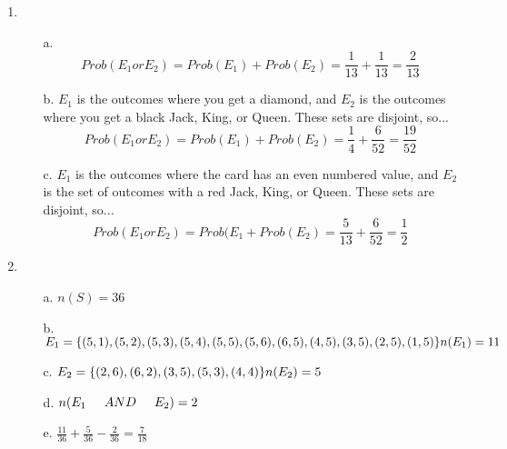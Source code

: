 {\begin{enumerate}
\begin{itemize}
                \item[c.]   When choosing a committee of three people
                            from a club with 8 men and 12 women, there are many ways in which
                            the committee can include a woman and a man,
                            so these events are not disjoint.
            \end{itemize}

        \item
            \begin{itemize}
                \item[a.]   $$Prob(E_{1} or E_{2}) = Prob(E_{1}) + Prob(E_{2}) = \frac{1}{13} + \frac{1}{13} = \frac{2}{13}$$

                \item[b.]   $E_{1}$ is the outcomes where you get a diamond,
                            and $E_{2}$ is the outcomes where you get a black Jack, King, or Queen.
                            These sets are disjoint, so...
                            $$Prob(E_{1} or E_{2}) = Prob(E_{1}) + Prob(E_{2}) = \frac{1}{4} + \frac{6}{52} = \frac{19}{52}$$

                \item[c.]   $E_{1}$ is the outcomes where the card has an even numbered value,
                            and $E_{2}$ is the set of outcomes with a red Jack, King, or Queen.
                            These sets are disjoint, so...
                            $$Prob(E_{1} or E_{2}) = Prob(E_{1} + Prob(E_{2}) = \frac{5}{13} + \frac{6}{52} = \frac{1}{2}$$
            \end{itemize}

        \item
            \begin{itemize}
                \item[a.]   $n(S) = 36$
                \item[b.]   $E_1 = \{ (5, 1), (5, 2), (5, 3), (5, 4), (5, 5), (5, 6),
                            (6, 5), (4, 5), (3, 5), (2, 5), (1, 5) \}
                            \\ n(E_1) = 11$
                \item[c.]    $E_2 = \{ (2, 6), (6, 2), (3, 5), (5, 3), (4, 4) \} \\     n(E_2) = 5$

                \item[d.]   $n(E_1 \tab[0.5cm]AND\tab[0.5cm] E_2) = 2$

                \item[e.]   $\frac{11}{36} + \frac{5}{36} - \frac{2}{36} = \frac{7}{18}$
            \end{itemize}


\end{enumerate}}
